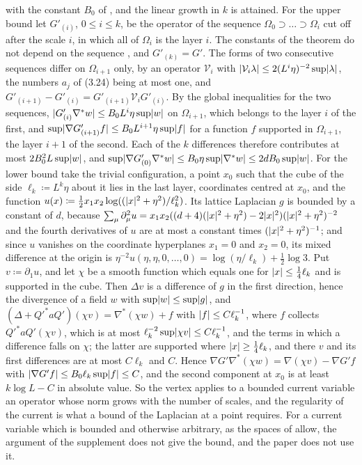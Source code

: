 \documentclass[11pt]{preprint}
\DeclarePairedDelimiter{\abs}{\lvert}{\rvert}
\numberwithin{equation}{section}
\begin{document}
with the constant $B_0$ of \cite[Theorem~3.1]{BalabanPBG}, and the linear growth in $k$ is attained. For the upper bound let $G'_{(i)}$, $0 \leq i \leq k$, be the operator of the sequence $\Omega_0 \supset \dots \supset \Omega_i$ cut off after the scale $i$, in which all of $\Omega_i$ is the layer $i$. The constants of the theorem do not depend on the sequence \cite[p.~399]{BalabanPBG}, and $G'_{(k)} = G'$. The forms \cite[(3.24)]{BalabanPBG} of two consecutive sequences differ on $\Omega_{i+1}$ only, by an operator $\mathcal V_i$ with $\abs{\mathcal V_i\lambda} \leq 2(L^i\eta)^{-2}\sup\abs\lambda$, the numbers $a_j$ of (3.24) being at most one, and $G'_{(i+1)} - G'_{(i)} = G'_{(i+1)}\mathcal V_iG'_{(i)}$. By the global inequalities \cite[(3.47)]{BalabanPBG} for the two sequences, $\abs{G'_{(i)}\nabla^*w} \leq B_0L^i\eta\sup\abs w$ on $\Omega_{i+1}$, which belongs to the layer $i$ of the first, and $\sup\abs{\nabla G'_{(i+1)}f} \leq B_0L^{i+1}\eta\sup\abs f$ for a function $f$ supported in $\Omega_{i+1}$, the layer $i + 1$ of the second. Each of the $k$ differences therefore contributes at most $2B_0^2L\sup\abs w$, and $\sup\abs{\nabla G'_{(0)}\nabla^*w} \leq B_0\eta\sup\abs{\nabla^*w} \leq 2dB_0\sup\abs w$. For the lower bound take the trivial configuration, a point $x_0$ such that the cube of the side $\ell_k \coloneqq L^k\eta$ about it lies in the last layer, coordinates centred at $x_0$, and the function $u(x) \coloneqq \frac{1}{2}x_1x_2\log((\abs x^2 + \eta^2)/\ell_k^2)$. Its lattice Laplacian $g$ is bounded by a constant of $d$, because $\sum_\mu\partial_\mu^2u = x_1x_2((d + 4)(\abs x^2 + \eta^2) - 2\abs x^2)(\abs x^2 + \eta^2)^{-2}$ and the fourth derivatives of $u$ are at most a constant times $(\abs x^2 + \eta^2)^{-1}$; and since $u$ vanishes on the coordinate hyperplanes $x_1 = 0$ and $x_2 = 0$, its mixed difference at the origin is $\eta^{-2}u(\eta, \eta, 0, \dots, 0) = \log(\eta/\ell_k) + \frac{1}{2}\log3$. Put $v \coloneqq \partial_1u$, and let $\chi$ be a smooth function which equals one for $\abs x \leq \frac{1}{4}\ell_k$ and is supported in the cube. Then $\Delta v$ is a difference of $g$ in the first direction, hence the divergence of a field $w$ with $\sup\abs w \leq \sup\abs g$, and $(\Delta + Q'^*aQ')(\chi v) = \nabla^*(\chi w) + f$ with $\abs f \leq C\ell_k^{-1}$, where $f$ collects $Q'^*aQ'(\chi v)$, which is at most $\ell_k^{-2}\sup\abs{\chi v} \leq C\ell_k^{-1}$, and the terms in which a difference falls on $\chi$; the latter are supported where $\abs x \geq \frac{1}{4}\ell_k$, and there $v$ and its first differences are at most $C\ell_k$ and $C$. Hence $\nabla G'\nabla^*(\chi w) = \nabla(\chi v) - \nabla G'f$ with $\abs{\nabla G'f} \leq B_0\ell_k\sup\abs f \leq C$, and the second component at $x_0$ is at least $k\log L - C$ in absolute value. So the vertex applies to a bounded current variable an operator whose norm grows with the number of scales, and the regularity of the current is what a bound of the Laplacian at a point requires. For a current variable which is bounded and otherwise arbitrary, as the spaces of \cite{BalabanRG1} allow, the argument of the supplement does not give the bound, and the paper does not use it.



\end{document}
